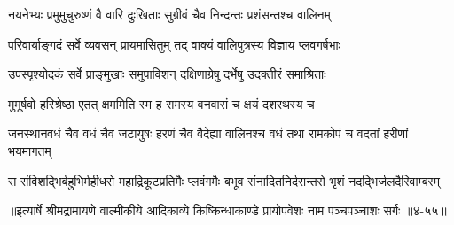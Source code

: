 \twolineshloka
{नयनेभ्यः प्रमुमुचुरुष्णं वै वारि दुःखिताः}
{सुग्रीवं चैव निन्दन्तः प्रशंसन्तश्च वालिनम्} %

\twolineshloka
{परिवार्याङ्गदं सर्वे व्यवसन् प्रायमासितुम्}
{तद् वाक्यं वालिपुत्रस्य विज्ञाय प्लवगर्षभाः} %

\twolineshloka
{उपस्पृश्योदकं सर्वे प्राङ्मुखाः समुपाविशन्}
{दक्षिणाग्रेषु दर्भेषु उदक्तीरं समाश्रिताः} %

\twolineshloka
{मुमूर्षवो हरिश्रेष्ठा एतत् क्षममिति स्म ह}
{रामस्य वनवासं च क्षयं दशरथस्य च} %

\threelineshloka
{जनस्थानवधं चैव वधं चैव जटायुषः}
{हरणं चैव वैदेह्या वालिनश्च वधं तथा}
{रामकोपं च वदतां हरीणां भयमागतम्} %

\twolineshloka
{स संविशद्भिर्बहुभिर्महीधरो महाद्रिकूटप्रतिमैः प्लवंगमैः}
{बभूव संनादितनिर्दरान्तरो भृशं नदद्भिर्जलदैरिवाम्बरम्} %


॥इत्यार्षे श्रीमद्रामायणे वाल्मीकीये आदिकाव्ये किष्किन्धाकाण्डे प्रायोपवेशः नाम पञ्चपञ्चाशः सर्गः ॥४-५५॥
